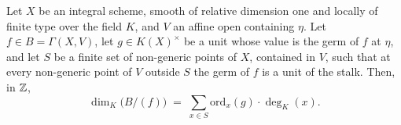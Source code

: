 \begin{theorem}
  \label{pa-thm:finrank_quotient_span_section}
  \leanok

  Let \(X\) be an integral scheme, smooth of relative dimension one and locally of
  finite type over the field \(K\), and \(V\) an affine open containing \(\eta\). Let
  \(f \in B = \Gamma(X, V)\), let \(g \in K(X)^\times\) be a unit whose value is the
  germ of \(f\) at \(\eta\), and let \(S\) be a finite set of non-generic points of
  \(X\), contained in \(V\), such that at every non-generic point of \(V\) outside
  \(S\) the germ of \(f\) is a unit of the stalk. Then, in \(\mathbb{Z}\),
  \[
    \dim_K\bigl(B/(f)\bigr) \;=\;
      \sum_{x \in S} \mathrm{ord}_x(g) \cdot \deg_K(x) .
  \]
\end{theorem}
